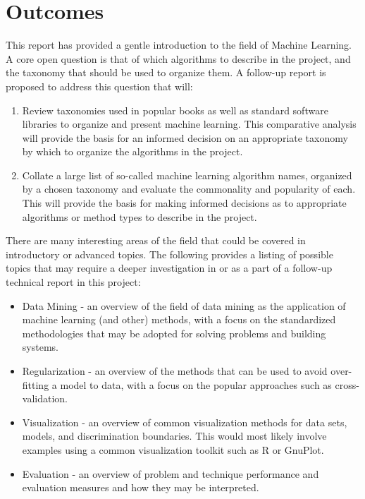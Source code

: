 \documentclass[a4paper, 11pt]{article}
\begin{document}
\section{Outcomes}
\label{sec:conclusions}
This report has provided a gentle introduction to the field of Machine Learning. A core open question is that of which algorithms to describe in the project, and the taxonomy that should be used to organize them. A follow-up report is proposed to address this question that will:

\begin{enumerate}
	\item Review taxonomies used in popular books as well as standard software libraries to organize and present machine learning. This comparative analysis will provide the basis for an informed decision on an appropriate taxonomy by which to organize the algorithms in the project.
	\item Collate a large list of so-called machine learning algorithm names, organized by a chosen taxonomy and evaluate the commonality and popularity of each. This will provide the basis for making informed decisions as to appropriate algorithms or method types to describe in the project.
\end{enumerate}

There are many interesting areas of the field that could be covered in introductory or advanced topics. The following provides a listing of possible topics that may require a deeper investigation in or as a part of a follow-up technical report in this project:

\begin{itemize}
	\item Data Mining - an overview of the field of data mining as the application of machine learning (and other) methods, with a focus on the standardized methodologies that may be adopted for solving problems and building systems.
	\item Regularization - an overview of the methods that can be used to avoid over-fitting a model to data, with a focus on the popular approaches such as cross-validation.
	\item Visualization - an overview of common visualization methods for data sets, models, and discrimination boundaries. This would most likely involve examples using a common visualization toolkit such as R or GnuPlot.
	\item Evaluation - an overview of problem and technique performance and evaluation measures and how they may be interpreted. 
\end{itemize}
\end{document}
